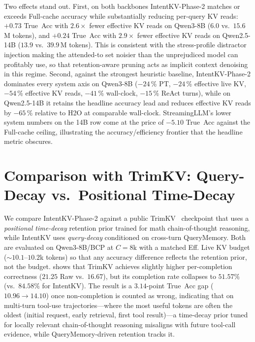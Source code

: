 \documentclass[11pt]{article}
\newcommand{\method}{IntentKV\xspace}
\newcommand{\learn}{Phase-2\xspace}
\begin{document}
Two effects stand out. First, on both backbones \method-\learn
matches or exceeds Full-cache accuracy while substantially reducing
per-query KV reads: $+0.73$ True~Acc with $2.6\times$ fewer
effective KV reads on Qwen3-8B ($6.0$ vs.\ $15.6$\,M tokens), and
$+0.24$ True~Acc with $2.9\times$ fewer effective KV reads on
Qwen2.5-14B ($13.9$ vs.\ $39.9$\,M tokens). This is consistent with
the stress-profile distractor injection making the attended-to set
noisier than the unprejudiced model can profitably use, so that
retention-aware pruning acts as implicit context denoising in this
regime. Second, against the strongest heuristic baseline,
\method-\learn dominates every system axis on Qwen3-8B ($-24$\,\%
PT, $-24$\,\% effective live KV, $-54$\,\% effective KV reads,
$-41$\,\% wall-clock, $-15$\,\% ReAct turns), while on Qwen2.5-14B
it retains the headline accuracy lead and reduces effective KV
reads by $-65$\,\% relative to H2O at comparable wall-clock.
StreamingLLM's lower system numbers on the 14B row come at the
price of $-5.10$ True~Acc against the Full-cache ceiling,
illustrating the accuracy/efficiency frontier that the headline
metric obscures.

\FloatBarrier

\section{Comparison with TrimKV: Query-Decay vs.\ Positional Time-Decay}
\label{appendix:design-axis}

We compare \method-\learn against a public TrimKV~\citep{bui2025cache}
checkpoint that uses a \emph{positional time-decay} retention prior
trained for math chain-of-thought reasoning, while \method uses
\emph{query-decay} conditioned on cross-turn QueryMemory. Both are
evaluated on Qwen3-8B/BCP at $C{=}8$k with a matched Eff. Live KV
budget ($\sim$$10.1$--$10.2$k tokens) so that any accuracy
difference reflects the retention prior, not the budget.
 shows that TrimKV achieves slightly higher
per-completion correctness ($21.25$ Raw vs.\ $16.67$), but its
completion rate collapses to $51.57\%$ (vs.\ $84.58\%$ for \method).
The result is a $3.14$-point True~Acc gap
($10.96\!\to\!14.10$) once non-completion is counted as wrong,
indicating that on multi-turn tool-use trajectories—where the most
useful tokens are often the oldest (initial request, early
retrieval, first tool result)—a time-decay prior tuned for locally
relevant chain-of-thought reasoning misaligns with future
tool-call evidence, while QueryMemory-driven retention tracks it.
\end{document}
